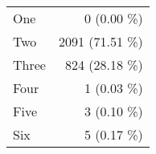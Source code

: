 \begin{tabular}{ l  r }
One & 0 (0.00 \%)\\
Two & 2091 (71.51 \%)\\
Three & 824 (28.18 \%)\\
Four & 1 (0.03 \%)\\
Five & 3 (0.10 \%)\\
Six & 5 (0.17 \%)\\
\end{tabular}
